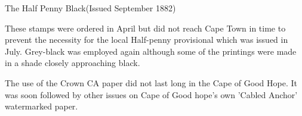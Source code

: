  
The Half Penny Black(Issued September 1882)

These stamps were ordered in April but did not reach Cape Town in time to prevent the necessity for the local Half-penny provisional which was issued in July. Grey-black was employed again although some of the printings were made in a shade closely approaching black.

The use of the Crown CA paper did not last long in the Cape of Good Hope. It was soon followed by other issues on Cape of Good hope's own 'Cabled Anchor' watermarked paper.

 

 


 

 

 

             
